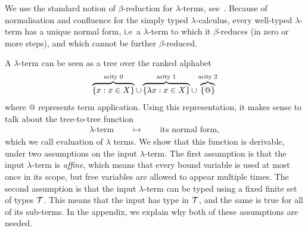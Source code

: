 We use the standard notion of $\beta$-reduction for $\lambda$-terms, see~\cite[Definition 1.2.1]{sorensen_lectures_2006}.  
Because of normalisation and confluence for the simply typed $\lambda$-calculus, every well-typed $\lambda$-term has a unique normal form, i.e~a $\lambda$-term to which it $\beta$-reduces (in zero or more steps), and which cannot be further $\beta$-reduced.

A $\lambda$-term  can be seen as a tree over the ranked alphabet
\begin{align}
    \label{eq:alphabet-for-lambda-terms}
  \overbrace{\{x : x \in X\}}^{\text{arity 0}} \cup \overbrace{\{\lambda x : x \in X\}}^{\text{arity 1}} \cup  \overbrace{\{@\}}^{\text{arity 2}}
\end{align}
where @ represents term application. Using this representation, it makes sense to talk about the tree-to-tree function
\begin{align*}
\text{$\lambda$-term} \qquad \mapsto \qquad \text{its normal form},
\end{align*}
which we call evaluation of $\lambda$ terms. We show that this function is derivable, under two assumptions on the input $\lambda$-term.  The first assumption is that the input $\lambda$-term is \emph{affine}, which means that 
    every bound variable is used at most once in its scope, but free variables are allowed to appear multiple times.  
     The second assumption is that  the input $\lambda$-term can be typed using a fixed finite set of types ${\mathcal T}$. This means that the input has type in ${\mathcal T}$, and the same is true for all of its  sub-terms.  In the appendix, we explain why both of these assumptions are needed.



